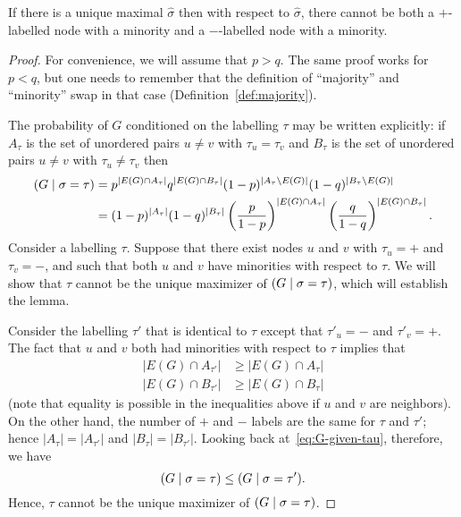 \documentclass[EJP]{ejpecp}
\newcommand{\1}[1]{\mathbbm{1}_{\{#1\}}}
\let\Pr\relax
\DeclareMathOperator{\Pr}{Pr}
\begin{document}
\begin{lemma}\label{lem:MAP-minority}
If there is a unique maximal $\hat \sigma$ then
with respect to $\hat \sigma$, there cannot be both a $+$-labelled node
with a minority and a $-$-labelled node with a minority.
\end{lemma}

\begin{proof}
For convenience, we will assume that $p > q$. The same
proof works for $p < q$, but one needs to remember that the definition
of ``majority'' and ``minority'' swap in that case
(Definition~\ref{def:majority}).

The probability of $G$ conditioned on the labelling $\tau$
may be written explicitly: if $A_\tau$ is the set of unordered pairs
$u \ne v$ with $\tau_u = \tau_v$ and $B_\tau$ is the set of unordered pairs
$u \ne v$ with $\tau_u \ne \tau_v$ then
\begin{align}
 \Pr(G \mid \sigma = \tau)
 &= p^{|E(G) \cap A_\tau|}
   q^{|E(G) \cap B_\tau|}
   (1-p)^{|A_\tau \setminus E(G)|}
   (1-q)^{|B_\tau \setminus E(G)|} \notag \\
 &= (1-p)^{|A_\tau|} (1-q)^{|B_\tau|}
  \left(\frac{p}{1-p}\right)^{|E(G) \cap A_\tau|}
  \left(\frac{q}{1-q}\right)^{|E(G) \cap B_\tau|}.
  \label{eq:G-given-tau}
\end{align}
Consider a labelling $\tau$.
Suppose that there exist nodes $u$ and $v$ with $\tau_u = +$
and $\tau_v = -$, and such that both $u$ and $v$ have minorities with respect
to $\tau$. We will show that $\tau$ cannot be the unique
maximizer of $\Pr(G \mid \sigma = \tau)$, which will establish the lemma.

Consider the labelling $\tau'$ that is identical to $\tau$
except that $\tau'_u = -$ and $\tau'_v = +$. The fact that $u$ and $v$
both had minorities with respect to $\tau$ implies that
\begin{align*}
 |E(G) \cap A_{\tau'}| &\ge |E(G) \cap A_\tau| \\
 |E(G) \cap B_{\tau'}| &\ge |E(G) \cap B_\tau|
\end{align*}
(note that equality is possible in the inequalities above if
$u$ and $v$ are neighbors). On the other hand, the number of $+$
and $-$ labels are the same for $\tau$ and $\tau'$; hence
$|A_\tau| = |A_{\tau'}|$ and $|B_\tau| = |B_{\tau'}|$.
Looking back at~\eqref{eq:G-given-tau}, therefore, we have
\[
 \Pr(G \mid \sigma = \tau) \le \Pr(G \mid \sigma = \tau').
\]
Hence, $\tau$ cannot be the unique maximizer of $\Pr(G \mid \sigma = \tau)$.
\end{proof}
\end{document}
